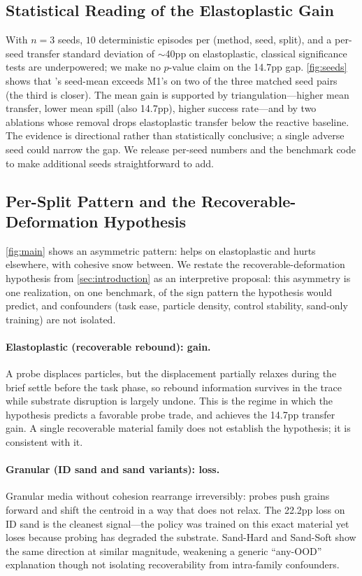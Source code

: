 \subsection{Statistical Reading of the Elastoplastic Gain}
\label{sec:results_stats}

With $n=3$ seeds, $10$ deterministic episodes per (method, seed, split), and a per-seed transfer standard deviation of $\sim$40pp on elastoplastic, classical significance tests are underpowered; we make no $p$-value claim on the 14.7pp gap. \cref{fig:seeds} shows that \PTA{}'s seed-mean exceeds M1's on two of the three matched seed pairs (the third is closer). The mean gain is supported by triangulation---higher mean transfer, lower mean spill (also 14.7pp), higher success rate---and by two ablations whose removal drops elastoplastic transfer below the reactive baseline. The evidence is directional rather than statistically conclusive; a single adverse seed could narrow the gap. We release per-seed numbers and the benchmark code to make additional seeds straightforward to add.

\subsection{Per-Split Pattern and the Recoverable-Deformation Hypothesis}
\label{sec:results_analysis}

\cref{fig:main} shows an asymmetric pattern: \PTA{} helps on elastoplastic and hurts elsewhere, with cohesive snow between. We restate the recoverable-deformation hypothesis from \cref{sec:introduction} as an interpretive proposal: this asymmetry is one realization, on one benchmark, of the sign pattern the hypothesis would predict, and confounders (task ease, particle density, control stability, sand-only training) are not isolated.

\paragraph{Elastoplastic (recoverable rebound): gain.}
A probe displaces particles, but the displacement partially relaxes during the brief settle before the task phase, so rebound information survives in the trace while substrate disruption is largely undone. This is the regime in which the hypothesis predicts a favorable probe trade, and \PTA{} achieves the 14.7pp transfer gain. A single recoverable material family does not establish the hypothesis; it is consistent with it.

\paragraph{Granular (ID sand and sand variants): loss.}
Granular media without cohesion rearrange irreversibly: probes push grains forward and shift the centroid in a way that does not relax. The 22.2pp loss on ID sand is the cleanest signal---the policy was trained on this exact material yet loses because probing has degraded the substrate. Sand-Hard and Sand-Soft show the same direction at similar magnitude, weakening a generic ``any-OOD'' explanation though not isolating recoverability from intra-family confounders.

